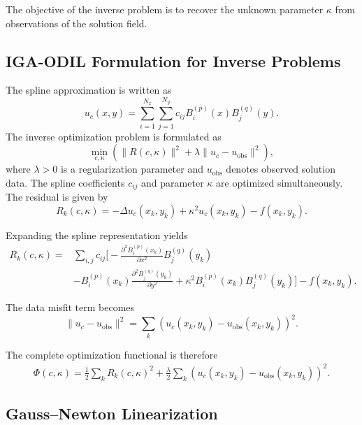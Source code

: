 \documentclass[review]{elsarticle}
\begin{document}
The objective of the inverse problem is to recover the unknown parameter $\kappa$ from observations of the solution field.

\subsection{IGA-ODIL Formulation for Inverse Problems}

The spline approximation is written as
\begin{equation}
u_c(x,y)=
\sum_{i=1}^{N_x}
\sum_{j=1}^{N_y}
c_{ij}
B_i^{(p)}(x)
B_j^{(q)}(y).
\label{eq:inverse_spline}
\end{equation}
The inverse optimization problem is formulated as
\begin{equation}
\min_{c,\kappa}
\left(
\|R(c,\kappa)\|^2
+
\lambda
\|u_c-u_{\mathrm{obs}}\|^2
\right),
\label{eq:inverse_objective}
\end{equation}
where $\lambda>0$ is a regularization parameter and $u_{\mathrm{obs}}$ denotes observed solution data.
The spline coefficients $c_{ij}$ and parameter $\kappa$ are optimized simultaneously.
The residual is given by
\begin{equation}
R_k(c,\kappa)=
-\Delta u_c(x_k,y_k)
+
\kappa^2 u_c(x_k,y_k)
-
f(x_k,y_k).
\end{equation}

Expanding the spline representation yields
\begin{align}
R_k(c,\kappa)
=
&
\sum_{i,j}
c_{ij}
\Bigg[
-
\frac{\partial^2 B_i^{(p)}(x_k)}{\partial x^2}
B_j^{(q)}(y_k)
\nonumber\\
&
-
B_i^{(p)}(x_k)
\frac{\partial^2 B_j^{(q)}(y_k)}{\partial y^2}
+
\kappa^2
B_i^{(p)}(x_k)
B_j^{(q)}(y_k)
\Bigg]
-f(x_k,y_k).
\end{align}

The data misfit term becomes
\begin{equation}
\|u_c-u_{\mathrm{obs}}\|^2
=
\sum_k
\left(
u_c(x_k,y_k)-u_{\mathrm{obs}}(x_k,y_k)
\right)^2.
\end{equation}

The complete optimization functional is therefore
\begin{align}
\Phi(c,\kappa)
=
\frac12
\sum_k
R_k(c,\kappa)^2
+
\frac{\lambda}{2}
\sum_k
\left(
u_c(x_k,y_k)-u_{\mathrm{obs}}(x_k,y_k)
\right)^2.
\label{eq:inverse_full_loss}
\end{align}

\subsection{Gauss--Newton Linearization}
\end{document}
